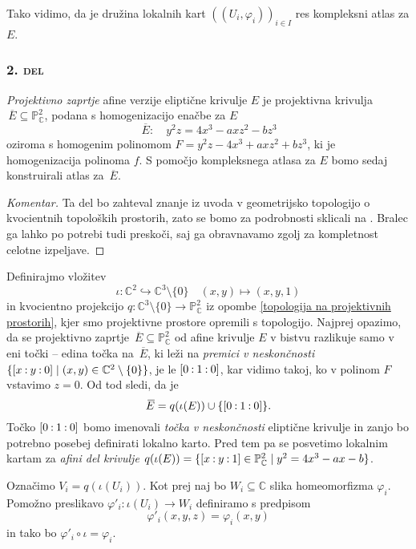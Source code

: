 \documentclass[mat1]{fmfdelo}
\numberwithin{equation}{section}
\newcommand{\C}{\mathbb C}
\newcommand{\PC}{\mathbb{P}^2_\C}
\newcommand{\oio}{\pcoor{0: 1 : 0}}
\newcommand{\pcoor}[1]{%
\begingroup\lccode`~=`: \lowercase{\endgroup
\edef~}{\mathbin{\mathchar\the\mathcode`:}\nobreak}%
\left[%
\begingroup
\mathcode`:=\string"8000
#1%
\endgroup
\right]%
}
\newcommand{\olsi}[1]{\,\overline{\!{#1}}} %
\theoremstyle{definition}
\newenvironment{komentar}[1][Komentar]{\begin{proof}[#1]\let\qed\relax}{\end{proof}}
\begin{document}
Tako vidimo, da je družina lokalnih kart $((U_i, \varphi_i))_{i \in I}$ res kompleksni atlas za $E$. 

\subsubsection*{\textsc{2. del}} 
\emph{Projektivno zaprtje} afine verzije eliptične krivulje $E$ je projektivna krivulja $\olsi{E} \subseteq \PC$, podana s homogenizacijo enačbe za $E$
\[
    \olsi{E} : \quad y^2z = 4x^3 - axz^2 - bz^3  
\]
oziroma s homogenim polinomom $F = y^2z - 4x^3 + axz^2 + bz^3$, ki je homogenizacija polinoma $f$. S pomočjo kompleksnega atlasa za $E$ bomo sedaj konstruirali atlas za $\olsi{E}$. 

\begin{komentar}
    Ta del bo zahteval znanje iz uvoda v geometrijsko topologijo o kvocientnih topoloških prostorih, zato se bomo za podrobnosti sklicali na \cite[poglavje 3.2.]{MrcunTop}. Bralec ga lahko po potrebi tudi preskoči, saj ga obravnavamo zgolj za kompletnost celotne izpeljave. 
\end{komentar}

Definirajmo vložitev 
\[
    \iota: \C^2 \hookrightarrow \C^3\setminus\{0\} \quad (x,y) \mapsto (x,y,1)
\]
in kvocientno projekcijo $q : \C^3 \setminus \{0\} \to \PC$ iz opombe \ref{topologija na projektivnih prostorih}, kjer smo projektivne prostore opremili s topologijo. Najprej opazimo, da se projektivno zaprtje $\olsi{E} \subseteq \PC$ od afine krivulje $E$ v bistvu razlikuje samo v eni točki -- edina točka na $\olsi{E}$, ki leži na \emph{premici v neskončnosti} $\{\pcoor{x : y : 0} \mid (x,y) \in \C^2\setminus\{0\}\}$, je le $\oio$, kar vidimo takoj, ko v polinom $F$ vstavimo $z = 0$. Od tod sledi, da je 
\[
    \olsi{E} = q(\iota(E)) \cup \{\pcoor{0 : 1 : 0}\}.
\] 
Točko $\pcoor{0 : 1 : 0}$ bomo imenovali \emph{točka v neskončnosti} eliptične krivulje in zanjo bo potrebno posebej definirati lokalno karto. Pred tem pa se posvetimo lokalnim kartam za \emph{afini del krivulje} $q(\iota(E)) = \{ \pcoor{x : y : 1} \in \PC \mid y^2 = 4x^3 - ax - b\}$.

Označimo $V_i = q(\iota(U_i))$. Kot prej naj bo $W_i \subseteq \C$ slika homeomorfizma $\varphi_i$. Pomožno preslikavo $\varphi'_i : \iota(U_i) \to W_i$ definiramo s predpisom 
\[
    \varphi'_i(x,y,z) = \varphi_i(x,y)
\]
in tako bo $\varphi'_i \circ \iota = \varphi_i$.
\end{document}

